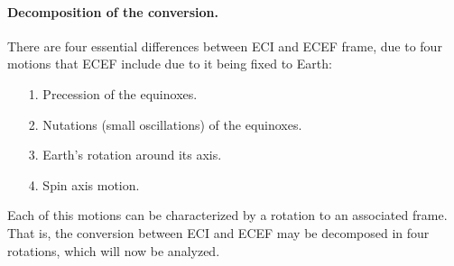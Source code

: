 		\paragraph{Decomposition of the conversion. \\}
		\indent There are four essential differences between ECI and ECEF frame, due to four motions that ECEF include due to it being fixed to Earth:
		\begin{itemize}
		\item[1.] Precession of the equinoxes.
		\item[2.] Nutations (small oscillations) of the equinoxes.
		\item[3.] Earth's rotation around its axis.
		\item[4.] Spin axis motion.
		\end{itemize}
		\indent Each of this motions can be characterized by a rotation to an associated frame. That is, the conversion between ECI and ECEF may be decomposed in four rotations, which will now be analyzed.
